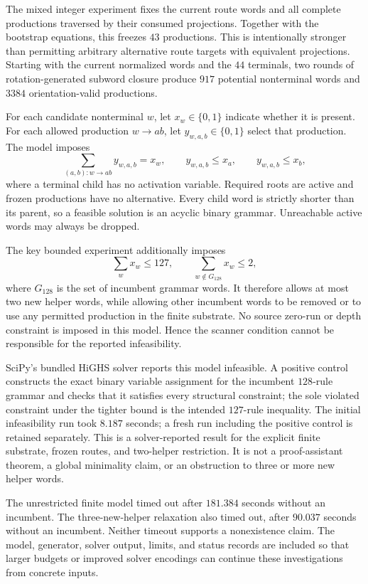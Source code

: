 The mixed integer experiment fixes the current route words and all complete
productions traversed by their consumed projections. Together with the
bootstrap equations, this freezes $43$ productions. This is intentionally
stronger than permitting arbitrary alternative route targets with equivalent
projections. Starting with the current normalized words and the $44$
terminals, two rounds of rotation-generated subword closure produce $917$
potential nonterminal words and $3384$ orientation-valid productions.

For each candidate nonterminal $w$, let $x_w\in\{0,1\}$ indicate whether
it is present. For each allowed production $w\to ab$, let
$y_{w,a,b}\in\{0,1\}$ select that production. The model imposes
\[
 \sum_{(a,b):w\to ab}y_{w,a,b}=x_w,
 \qquad y_{w,a,b}\le x_a,
 \qquad y_{w,a,b}\le x_b,
\]
where a terminal child has no activation variable. Required roots are
active and frozen productions have no alternative. Every child word is
strictly shorter than its parent, so a feasible solution is an acyclic
binary grammar. Unreachable active words may always be dropped.

The key bounded experiment additionally imposes
\[
 \sum_w x_w\le127,
 \qquad
 \sum_{w\notin G_{128}}x_w\le2,
\]
where $G_{128}$ is the set of incumbent grammar words. It therefore allows
at most two new helper words, while allowing other incumbent words to be
removed or to use any permitted production in the finite substrate.
No source zero-run or depth constraint is imposed in this model. Hence the
scanner condition cannot be responsible for the reported infeasibility.

SciPy's bundled HiGHS solver reports this model infeasible. A positive
control constructs the exact binary variable assignment for the incumbent
$128$-rule grammar and checks that it satisfies every structural constraint;
the sole violated constraint under the tighter bound is the intended
$127$-rule inequality. The initial infeasibility run took $8.187$ seconds;
a fresh run including the positive control is retained separately. This is
a solver-reported result for the explicit finite substrate, frozen routes,
and two-helper restriction. It is not a proof-assistant theorem, a global
minimality claim, or an obstruction to three or more new helper words.

The unrestricted finite model timed out after $181.384$ seconds without an
incumbent. The three-new-helper relaxation also timed out, after $90.037$
seconds without an incumbent. Neither timeout supports a nonexistence
claim. The model, generator, solver output, limits, and status records are
included so that larger budgets or improved solver encodings can continue
these investigations from concrete inputs.

